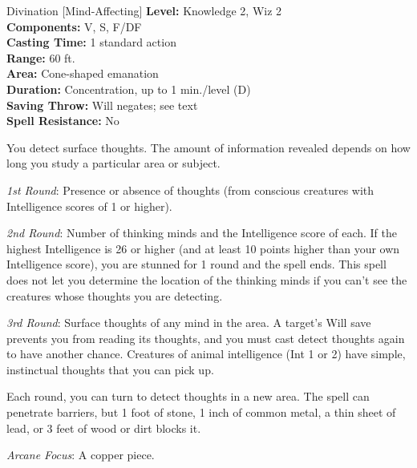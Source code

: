 {Divination [Mind-Affecting]}
{
	\textbf{Level:}
	Knowledge 2, Wiz 2\\
	\textbf{Components:}
	V, S, F/DF\\
	\textbf{Casting Time:}
	1 standard action\\
	\textbf{Range:}
	60 ft.\\
	\textbf{Area:}
	Cone-shaped emanation\\
	\textbf{Duration:}
	Concentration, up to 1 min./level (D)\\
	\textbf{Saving Throw:}
	Will negates; see text\\
	\textbf{Spell Resistance:}
	No\\
}
{
	You detect surface thoughts. The amount of information revealed depends on how long you study a particular area or subject.

	\textit{1st Round}:
	Presence or absence of thoughts (from conscious creatures with Intelligence scores of 1 or higher).

	\textit{2nd Round}:
	Number of thinking minds and the Intelligence score of each. If the highest Intelligence is 26 or higher (and at least 10 points higher than your own Intelligence score), you are stunned for 1 round and the spell ends. This spell does not let you determine the location of the thinking minds if you can't see the creatures whose thoughts you are detecting.

	\textit{3rd Round}:
	Surface thoughts of any mind in the area. A target's Will save prevents you from reading its thoughts, and you must cast detect thoughts again to have another chance. Creatures of animal intelligence (Int 1 or 2) have simple, instinctual thoughts that you can pick up.

	Each round, you can turn to detect thoughts in a new area. The spell can penetrate barriers, but 1 foot of stone, 1 inch of common metal, a thin sheet of lead, or 3 feet of wood or dirt blocks it.

	\textit{Arcane Focus}:
	A copper piece.

}
